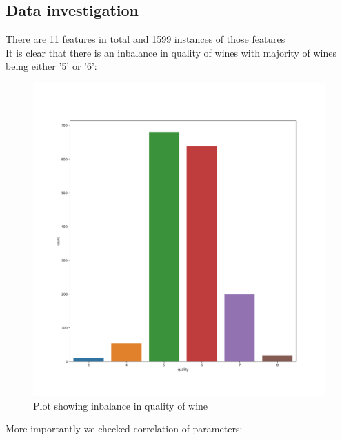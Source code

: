 \documentclass{article}[12pt]
\begin{document}
\subsection{Data investigation}
There are 11 features in total and 1599 instances of those features \\ 
It is clear that there is an inbalance in quality of wines with majority of wines being either '5' or '6':
\begin{figure}[H]
    \caption{Plot showing inbalance in quality of wine}
    \includegraphics[width=\textwidth]{inbalance.png}
    \centering
    \end{figure}
More importantly we checked correlation of parameters:
\end{document}
